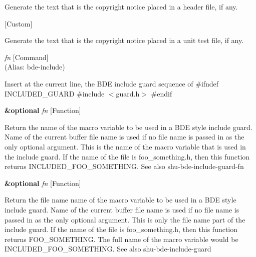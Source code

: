 \begin{doc-string}
Generate the text that is the copyright notice placed in a header file,
if any.
\end{doc-string}

\vspace{1em}
\noindent
{}
\usebox{\funcname}
 \hfill [Custom]

\begin{doc-string}
Generate the text that is the copyright notice placed in a unit test
file, if any.
\end{doc-string}

\vspace{1em}
\noindent
{}
\usebox{\funcname}\emph{fn}
 \hfill [Command]\\%
 (Alias: bde-include)

\begin{doc-string}
Insert at the current line, the BDE include guard sequence of
\#ifndef INCLUDED\_GUARD
\#include $<$guard.h$>$
\#endif
\end{doc-string}

\vspace{1em}
\noindent
{}
\usebox{\funcname}\textbf{\&optional} \emph{fn}
 \hfill [Function]

\begin{doc-string}
Return the name of the macro variable to be used in a BDE style include guard.
Name of the current buffer file name is used if no file name is passed in as the
only optional argument.  This is the name of the macro variable that is used in the
include guard.  If the name of the file is foo\_something.h, then this function
returns INCLUDED\_FOO\_SOMETHING.  See also shu-bde-include-guard-fn
\end{doc-string}

\vspace{1em}
\noindent
{}
\usebox{\funcname}\textbf{\&optional} \emph{fn}
 \hfill [Function]

\begin{doc-string}
Return the file name name of the macro variable to be used in a BDE style include
guard.  Name of the current buffer file name is used if no file name is passed in as
the only optional argument.  This is only the file name part of the include guard.
If the name of the file is foo\_something.h, then this function returns
FOO\_SOMETHING.  The full name of the macro variable would be
INCLUDED\_FOO\_SOMETHING.  See also shu-bde-include-guard
\end{doc-string}

